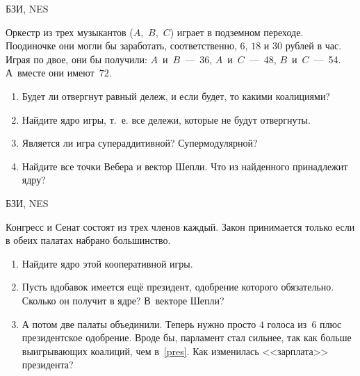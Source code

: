 \begin{problem} 
\begin{source}
БЗИ, NES
\end{source}
 Оркестр из трех музыкантов
($A$,~$B$,~$C$) играет в подземном переходе. Поодиночке они
могли бы заработать, соответственно, $6$, $18$ и $30$
рублей в час. Играя по двое, они бы получили:
$A$~и~$B$~---~36, $A$~и~$C$~---~48, $B$~и~$C$~---~54.
А~вместе они имеют~$72$.

\begin{enumerate}

\item Будет ли отвергнут равный дележ, и если будет, то
какими коалициями?

\item Найдите ядро игры, т.~е. все дележи, которые не будут
отвергнуты.

\item Является ли игра супераддитивной? Супермодулярной?

\item Найдите все точки Вебера и вектор Шепли. Что из
найденного принадлежит ядру?

\end{enumerate}






\begin{sol}

\end{sol}
\end{problem}





\begin{problem} [Парламент.]
\begin{source}
БЗИ, NES
\end{source} Конгресс и Сенат состоят из трех
членов каждый. Закон принимается только если в обеих
палатах набрано большинство.

\begin{enumerate}

\item Найдите ядро этой кооперативной игры.

\item\label{pres} Пусть вдобавок имеется ещё президент,
одобрение которого обязательно. Сколько он получит в ядре?
В~векторе Шепли?

\item А потом две палаты объединили. Теперь нужно просто
$4$ голоса из~$6$ плюс президентское одобрение. Вроде бы,
парламент стал сильнее, так как больше выигрывающих
коалиций, чем в~\ref{pres}. Как изменилась <<зарплата>>
президента?

\end{enumerate}
\begin{sol}

\end{sol}
\end{problem}





